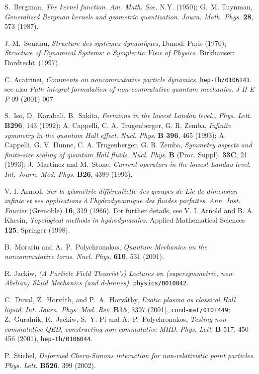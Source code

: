 \documentclass[a4paper,11pt]{article}
\begin{document}
\begin{thebibliography}{99}
S.~Bergman,
{\it The kernel function}.
{\sl Am. Math. Soc.} N.Y. (1950);
  G.~M. Tuynman,
  {\it Generalized Bergman kernels and geometric quantization}.
{\sl Journ. Math. Phys.} {\bf 28}, 573 (1987).


J.-M.~Souriau,
{\it Structure des syst\`emes dynamiques},
Dunod: Paris (1970);
{\it Structure of Dynamical Systems: a Symplectic View of Physics}.
Birkh\"auser: Dordrecht~(1997).

C. Acatrinei,
{\it Comments on noncommutative particle dynamics}. \texttt{hep-th/0106141}.
see also
{\it Path integral formulation of non-commutative quantum mechanics}.
{\sl J H E P} 09 (2001) 007.

S.~Iso, D.~Karabali, B.~Sakita,
{\it Fermions in the lowest Landau level\dots}
{\sl Phys. Lett.} {\bf   B296}, 143 (1992);
A. Cappelli, C. A. Trugenberger, G. R. Zemba,
{\it Infinite symmetry in the quantum Hall effect}.
{\sl Nucl. Phys}. {\bf   B 396}, 465 (1993);
A. Cappelli, G. V. Dunne, C. A. Trugenberger, G. R. Zemba,
{\it Symmetry aspects and finite-size scaling of quantum Hall fluids}.
{\sl Nucl. Phys}. {\bf  B} (Proc. Suppl). {\bf 33C}, 21 (1993);
J.~Martinez and M.~Stone,
{\it Current operators in the lowest Landau level}.
{\sl Int. Journ. Mod. Phys.} {\bf B26}, 4389 (1993).

V. I. Arnold,
{\it Sur la g\'eom\'etrie diff\'erentielle des groupes de Lie
de dimension infinie et ses applications \`a l'hydrodynamique des
fluides parfaites}.
{\sl Ann. Inst. Fourier} (Grenoble) {\bf 16}, 319 (1966).
For further details, see
V. I. Arnold and B. A. Khesin,
{\it Topological methods in hydrodynamics}.
Applied Mathematical Sciences {\bf 125}.
Springer (1998).


B.~Morariu and A.~P.~Polychronakos,
{\it Quantum Mechanics on the noncommutative torus}.
{\sl Nucl. Phys.} {\bf 610}, 531 (2001).

  {R. Jackiw}, {\sl (A Particle Field Theorist's)
  Lectures on (supersymmetric, non-Abelian) Fluid Mechanics
  (and d-branes)}. \texttt{physics/0010042}.

  C.~Duval, Z.~Horv\'ath, and P.~A.~Horv\'athy,
  {\it Exotic plasma as classical Hall liquid}.
  {\sl Int. Journ. Phys. Mod. Rev}. {\bf B15},
3397 (2001), \texttt{cond-mat/0101449};
{Z.~Guralnik, R.~Jackiw, S.~Y. Pi and A.~P.~Polychronakos},
  {\it Testing non-commutative QED, constructing non-commutative MHD}.
   {\sl Phys. Lett}. {\bf B} 517, 450-456 (2001),
   \texttt{hep-th/0106044}.

P.~Stichel,
{\it Deformed Chern-Simons interaction for non-relativistic point particles}.
{\sl Phys. Lett.} {\bf B526}, 399 (2002).

\end{thebibliography}
\end{document}
